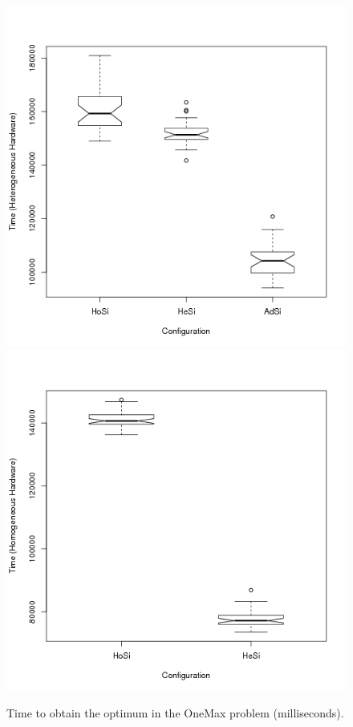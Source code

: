 \begin{figure}
\centering

    \includegraphics[scale =0.4] {gfx/adaptiveresults/timeONEMAXhetero.png}
   \label{fig:subfig1}
    \includegraphics[scale =0.4] {gfx/adaptiveresults/timeONEMAXhomo.png}
   \label{fig:subfig2}
\caption{Time to obtain the optimum in the OneMax problem (milliseconds).}
\label{fig:timeOneMax}
\end{figure}

